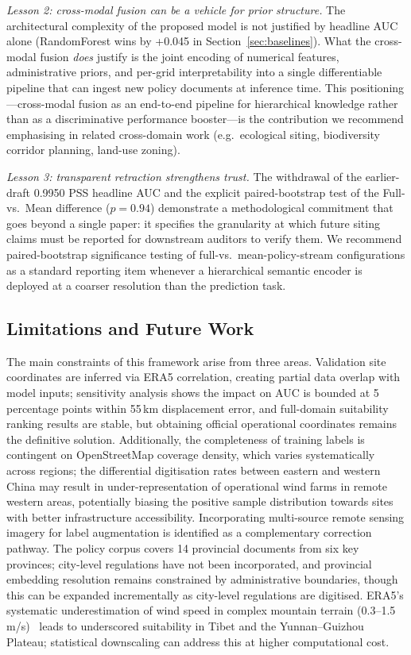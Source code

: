 \documentclass[12pt, a4paper]{article}
\begin{document}
\textit{Lesson 2: cross-modal fusion can be a vehicle for prior
structure.} The architectural complexity of the proposed model
is not justified by headline AUC alone (RandomForest wins by
+0.045 in Section~\ref{sec:baselines}). What the cross-modal
fusion \textit{does} justify is the joint encoding of
numerical features, administrative priors, and per-grid
interpretability into a single differentiable pipeline that
can ingest new policy documents at inference time. This
positioning---cross-modal fusion as an end-to-end pipeline for
hierarchical knowledge rather than as a discriminative
performance booster---is the contribution we recommend
emphasising in related cross-domain work (e.g.\ ecological
siting, biodiversity corridor planning, land-use zoning).

\textit{Lesson 3: transparent retraction strengthens trust.} The
withdrawal of the earlier-draft 0.9950 PSS headline AUC and the
explicit paired-bootstrap test of the Full-vs.\ Mean
difference ($p=0.94$) demonstrate a methodological commitment
that goes beyond a single paper: it specifies the granularity
at which future siting claims must be reported for downstream
auditors to verify them. We recommend paired-bootstrap
significance testing of full-vs.\ mean-policy-stream
configurations as a standard reporting item whenever a
hierarchical semantic encoder is deployed at a coarser
resolution than the prediction task.

\subsection{Limitations and Future Work}

The main constraints of this framework arise from three areas.
Validation site coordinates are inferred via ERA5 correlation,
creating partial data overlap with model inputs; sensitivity
analysis shows the impact on AUC is bounded at 5 percentage
points within 55\,km displacement error, and full-domain
suitability ranking results are stable, but obtaining official operational
coordinates remains the definitive solution. Additionally, the completeness of training labels is 
contingent on OpenStreetMap coverage density, which varies 
systematically across regions; the differential digitisation 
rates between eastern and western China may result in 
under-representation of operational wind farms in remote 
western areas, potentially biasing the positive sample 
distribution towards sites with better infrastructure 
accessibility. Incorporating multi-source remote sensing 
imagery for label augmentation is identified as a 
complementary correction pathway. The policy corpus
covers 14 provincial documents from six key provinces; city-level
regulations have not been incorporated, and provincial
embedding resolution remains constrained by administrative
boundaries, though this can be expanded incrementally as
city-level regulations are digitised. ERA5's systematic
underestimation of wind speed in complex mountain terrain
(0.3--1.5\,m/s)~\cite{hersbach2020} leads to underscored
suitability in Tibet and the Yunnan--Guizhou Plateau;
statistical downscaling can address this at higher
computational cost.
\end{document}
